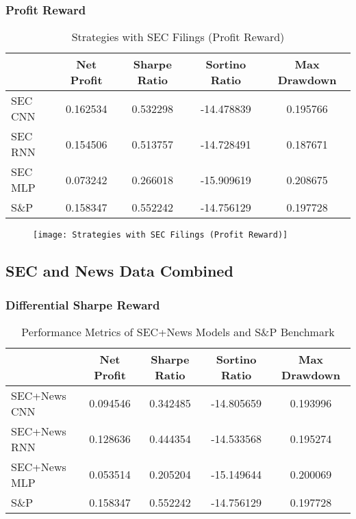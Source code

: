 \subsubsection{Profit Reward}

\begin{table}[htbp]
    \centering
    \caption{Strategies with SEC Filings (Profit Reward)}
      \begin{tabular}{lcccc}
      \toprule
            & Net Profit & Sharpe Ratio & Sortino Ratio & Max Drawdown \\
      \midrule
      SEC CNN & 0.162534 & 0.532298 & -14.478839 & 0.195766 \\
      SEC RNN & 0.154506 & 0.513757 & -14.728491 & 0.187671 \\
      SEC MLP & 0.073242 & 0.266018 & -15.909619 & 0.208675 \\
      S\&P   & 0.158347 & 0.552242 & -14.756129 & 0.197728 \\
      \bottomrule
      \end{tabular}%
    \label{tab:addlabel}%
  \end{table}%

\begin{center}
    \begin{figure}
    \texttt{[image: Strategies with SEC Filings (Profit Reward)]}
    \end{figure}
\end{center}



\subsection{SEC and News Data Combined}

\subsubsection{Differential Sharpe Reward}

\begin{table}[htbp]
    \centering
    \caption{Performance Metrics of SEC+News Models and S\&P Benchmark}
      \begin{tabular}{lcccc}
      \toprule
            & Net Profit & Sharpe Ratio & Sortino Ratio & Max Drawdown \\
      \midrule
      SEC+News CNN & 0.094546 & 0.342485 & -14.805659 & 0.193996 \\
      SEC+News RNN & 0.128636 & 0.444354 & -14.533568 & 0.195274 \\
      SEC+News MLP & 0.053514 & 0.205204 & -15.149644 & 0.200069 \\
      S\&P   & 0.158347 & 0.552242 & -14.756129 & 0.197728 \\
      \bottomrule
      \end{tabular}%
    \label{tab:addlabel}%
  \end{table}%

